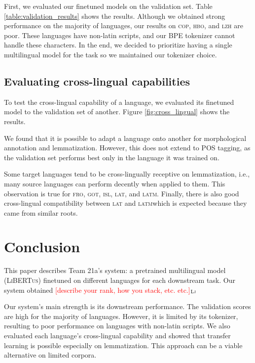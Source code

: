 \documentclass[11pt]{article}
\newcommand{\draftonly}[1]{#1}
\newcommand{\draftcomment}[3]{\draftonly{\textcolor{#2}{[#3]{$_{\textsc{#1}}$}}}}
\newcommand{\lj}[1]{\draftcomment{Lj}{red}{#1}}
\newcommand{\libertus}{\textsc{LiBERTus}}
\begin{document}


First, we evaluated our finetuned models on the validation set.
Table \ref{table:validation_results} shows the results.
Although we obtained strong performance on the majority of languages, our results on \textsc{cop}, \textsc{hbo}, and \textsc{lzh} are poor.
These languages have non-latin scripts, and our BPE tokenizer cannot handle these characters.
In the end, we decided to prioritize having a single multilingual model for the task so we maintained our tokenizer choice.

\subsection{Evaluating cross-lingual capabilities}
\label{sec:results_crosslingual}

To test the cross-lingual capability of a language, we evaluated its finetuned model to the validation set of another.
Figure \ref{fig:cross_lingual} shows the results.

We found that it is possible to adapt a language onto another for morphological annotation and lemmatization.
However, this does not extend to POS tagging, as the validation set performs best only in the language it was trained on.

Some target languages tend to be cross-lingually receptive on lemmatization, i.e., many source languages can perform decently when applied to them.
This observation is true for \textsc{fro}, \textsc{got}, \textsc{isl}, \textsc{lat}, and \textsc{latm}.
Finally, there is also good cross-lingual compatibility between \textsc{lat} and \textsc{latm}\textemdash which is expected because they came from similar roots. 

\section{Conclusion}

This paper describes Team 21a's system: a pretrained multilingual model (\libertus{}) finetuned on different languages for each downstream task.
Our system obtained \lj{describe your rank, how you stack, etc. etc.}

Our system's main strength is its downstream performance.
The validation scores are high for the majority of languages.
However, it is limited by its tokenizer, resulting to poor performance on languages with non-latin scripts.
We also evaluated each language's cross-lingual capability and showed that transfer learning is possible especially on lemmatization.
This approach can be a viable alternative on limited corpora.
\end{document}
